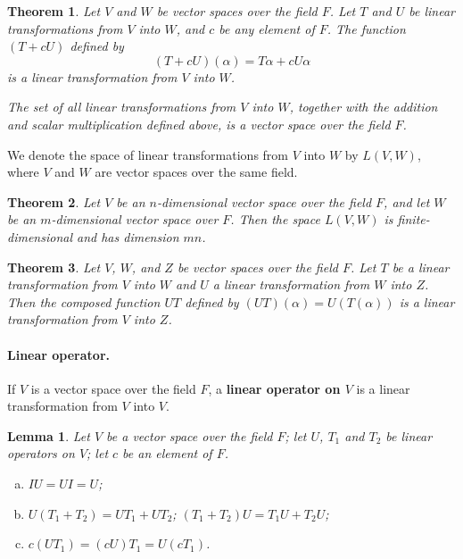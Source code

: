 \documentclass{article}
\newtheorem{theorem}{Theorem}[section]
\newtheorem*{lemma*}{Lemma}
\begin{document}
\begin{theorem}
  Let $V$ and $W$ be vector spaces over the field $F$. Let $T$ and $U$ be linear
  transformations from $V$ into $W$, and $c$ be any element of $F$. The function
  $(T + cU)$ defined by \[
    (T + cU)(\alpha) = T\alpha + cU\alpha
  \] is a linear transformation from $V$ into $W$.

  The set of all linear transformations from $V$ into $W$, together with the
  addition and scalar multiplication defined above, is a vector space over the
  field $F$.
\end{theorem}

We denote the space of linear transformations from $V$ into $W$ by $L(V, W)$,
where $V$ and $W$ are vector spaces over the same field.

\begin{theorem}
  Let $V$ be an $n$-dimensional vector space over the field $F$, and let $W$ be
  an $m$-dimensional vector space over $F$. Then the space $L(V, W)$ is
  finite-dimensional and has dimension $mn$.
\end{theorem}

\begin{theorem}
  Let $V$, $W$, and $Z$ be vector spaces over the field $F$. Let $T$ be a linear
  transformation from $V$ into $W$ and $U$ a linear transformation from $W$ into
  $Z$. Then the composed function $UT$ defined by $(UT)(\alpha) = U(T(\alpha))$
  is a linear transformation from $V$ into $Z$.
\end{theorem}

\paragraph{Linear operator.} If $V$ is a vector space over the field $F$, a
\textbf{linear operator on $V$} is a linear transformation from $V$ into $V$.

\begin{lemma*}
  Let $V$ be a vector space over the field $F$; let $U$, $T_1$ and $T_2$ be
  linear operators on $V$; let $c$ be an element of $F$.
  \begin{enumerate}[(a)]
    \item $IU = UI = U$;
    \item $U(T_1 + T_2) = UT_1 + UT_2$; $(T_1 + T_2)U = T_1U + T_2U$;
    \item $c(UT_1) = (cU)T_1 = U(cT_1)$.
  \end{enumerate}
\end{lemma*}
\end{document}
